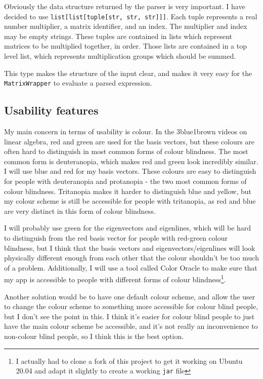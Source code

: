 \documentclass[../main.tex]{subfiles}
\begin{document}
Obviously the data structure returned by the parser is very important. I have decided to use \texttt{list[list[tuple[str, str, str]]]}. Each tuple represents a real number multiplier, a matrix identifier, and an index. The multiplier and index may be empty strings. These tuples are contained in lists which represent matrices to be multiplied together, in order. Those lists are contained in a top level list, which represents multiplication groups which should be summed.

This type makes the structure of the input clear, and makes it very easy for the \texttt{MatrixWrapper} to evaluate a parsed expression.

\subsection{Usability features\label{design:usability-features}}

My main concern in terms of usability is colour. In the 3blue1brown videos on linear algebra, red and green are used for the basis vectors, but these colours are often hard to distinguish in most common forms of colour blindness. The most common form is deuteranopia\cite{types-of-color-blindness}, which makes red and green look incredibly similar. I will use blue and red for my basis vectors. These colours are easy to distinguish for people with deuteranopia and protanopia - the two most common forms of colour blindness. Tritanopia makes it harder to distinguish blue and yellow, but my colour scheme is still be accessible for people with tritanopia, as red and blue are very distinct in this form of colour blindness.

I will probably use green for the eigenvectors and eigenlines, which will be hard to distinguish from the red basis vector for people with red-green colour blindness, but I think that the basis vectors and eigenvectors/eigenlines will look physically different enough from each other that the colour shouldn't be too much of a problem. Additionally, I will use a tool called Color Oracle\cite{colororacle.org} to make sure that my app is accessible to people with different forms of colour blindness\footnote{I actually had to clone a fork of this project\cite{color-oracle-dorkbox-fork} to get it working on Ubuntu 20.04 and adapt it slightly to create a working \texttt{jar} file}.

Another solution would be to have one default colour scheme, and allow the user to change the colour scheme to something more accessible for colour blind people, but I don't see the point in this. I think it's easier for colour blind people to just have the main colour scheme be accessible, and it's not really an inconvenience to non-colour blind people, so I think this is the best option.
\end{document}
